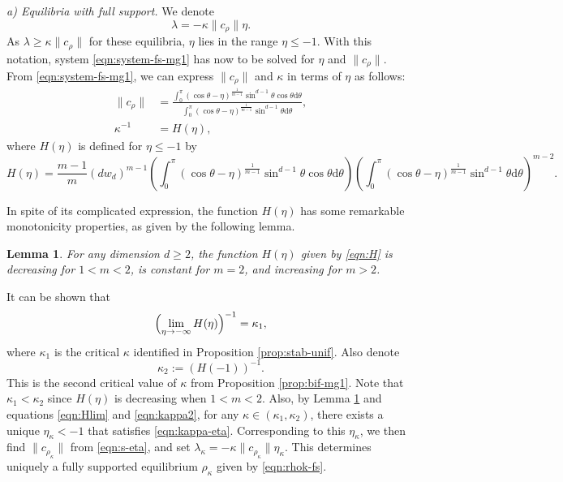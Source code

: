 \documentclass[11pt]{amsart}
\newtheorem{lemma}{Lemma}[section]
\def\d{\mathrm{d}}
\newcommand{\dm}{d} %
\begin{document}
{\em a) Equilibria with full support.} We denote 
\begin{equation}
\label{eqn:eta-notation}
\lambda=-\kappa \| c_\rho\| \eta.
\end{equation}
As $\lambda \geq \kappa \| c_\rho\|$ for these equilibria, $\eta$ lies in the range $\eta\leq -1$. With this notation, system \eqref{eqn:system-fs-mg1} has now to be solved for $\eta$ and $\|c_\rho\|$.
From \eqref{eqn:system-fs-mg1}, we can express $\| c_\rho\|$ and $\kappa$ in terms of $\eta$ as follows:
\begin{subequations}
\label{eqn:skappa-eta}
\begin{align}
 \| c_\rho\| &=\frac{\int_0^\pi (\cos\theta-\eta)^{\frac{1}{m-1}}\sin^{\dm-1}\theta \cos\theta\d\theta}{\int_0^\pi (\cos\theta-\eta)^{\frac{1}{m-1}}\sin^{\dm-1}\theta\d\theta}, \label{eqn:s-eta} \\[2pt]
 \kappa^{-1}&= H(\eta), \label{eqn:kappa-eta}
\end{align}
\end{subequations}
where $H(\eta)$ is defined for $\eta\leq -1$ by
\begin{equation}
\label{eqn:H}
H(\eta)= \frac{m-1}{m} (\dm w_\dm)^{m-1} \left(\int_0^\pi (\cos\theta-\eta)^{\frac{1}{m-1}}\sin^{\dm-1}\theta \cos\theta\d\theta\right)
\left(\int_0^\pi (\cos\theta-\eta)^{\frac{1}{m-1}}\sin^{\dm-1}\theta\d\theta\right)^{m-2}.
\end{equation}

In spite of its complicated expression, the function $H(\eta)$ has some remarkable monotonicity properties, as given by the following lemma.
\begin{lemma}\cite[Lemma 4.1]{FePaVa2025}
\label{lem:H-monotone}
For any dimension $\dm \geq 2$, the function $H(\eta)$ given by \eqref{eqn:H} is decreasing for $1<m<2$, is constant for $m=2$, and increasing for $m>2$.    
\end{lemma}

It can be shown \cite{FePaVa2025} that 
\begin{equation}
\label{eqn:Hlim}
\Bigl( \lim_{\eta \to -\infty } H(\eta)\Bigr)^{-1} = \kappa_1,
\end{equation}
where $\kappa_1$ is the critical $\kappa$ identified in Proposition \ref{prop:stab-unif}. Also denote
\begin{equation}
\label{eqn:kappa2}
\kappa_{2}:= (H(-1))^{-1}.
\end{equation}
This is the second critical value of $\kappa$ from Proposition \ref{prop:bif-mg1}. Note that $\kappa_1<\kappa_2$ since $H(\eta)$ is decreasing when $1<m<2$. Also, by Lemma \ref{lem:H-monotone} and equations  \eqref{eqn:Hlim} and \eqref{eqn:kappa2}, for any $\kappa \in (\kappa_{1},\kappa_{2})$, there exists a unique $\eta_\kappa <-1$ that satisfies \eqref{eqn:kappa-eta}. Corresponding to this $\eta_\kappa$, we then find $\|c_{\rho_\kappa}\|$ from \eqref{eqn:s-eta}, and set $\lambda_\kappa = -\kappa \|c_{\rho_\kappa}\| \eta_\kappa$. This determines uniquely a fully supported equilibrium $\rho_\kappa$ given by \eqref{eqn:rhok-fs}. 
\end{document}
